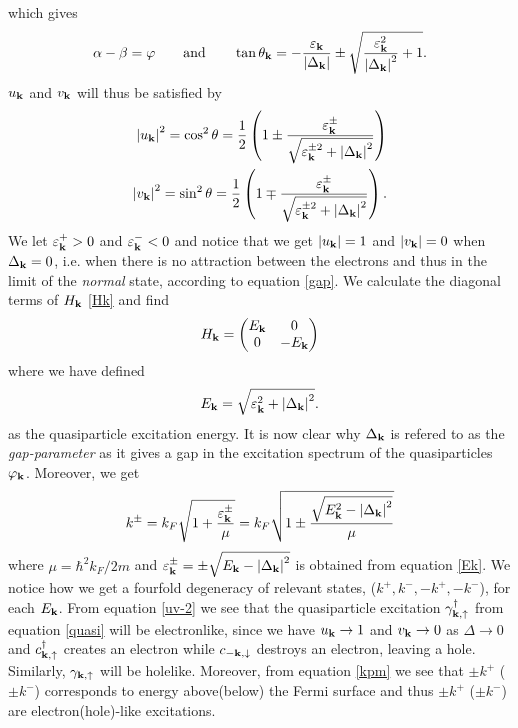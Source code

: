 which gives 
\begin{equation}
\alpha - \beta = \varphi
\qquad \mathrm{and} \qquad
\tan\theta_{\mathbf{k}} = -\frac{\varepsilon_{\mathbf{k}}}{\left|\Delta_{\mathbf{k}}\right|}\pm\sqrt{\frac{\varepsilon_{\mathbf{k}}^2}{\left|\Delta_{\mathbf{k}}\right|^2}+1}.
\label{tan}
\end{equation}
$u_{\mathbf{k}}$ and $v_{\mathbf{k}}$ will thus be satisfied by
\begin{equation}
\begin{split}
    \left|u_{\mathbf{k}}\right|^2 = \cos^2\theta = \frac{1}{2}\left(1 \pm \frac{\varepsilon^{\pm}_{\mathbf{k}}}{\sqrt{\varepsilon_{\mathbf{k}}^{\pm2} + \left|\Delta_{\mathbf{k}}\right|^2}}\right)    
    \\
    \left|v_{\mathbf{k}}\right|^2 = \sin^2\theta = \frac{1}{2}\left(1 \mp \frac{\varepsilon^{\pm}_{\mathbf{k}}}{\sqrt{\varepsilon_{\mathbf{k}}^{\pm2} + \left|\Delta_{\mathbf{k}}\right|^2}}\right).
\end{split}
\label{uv-2}
\end{equation}
We let $\varepsilon^+_{\mathbf{k}}>0$ and $\varepsilon^-_{\mathbf{k}}<0$ and notice that we get $\left|u_{\mathbf{k}}\right| = 1$ and $\left|v_{\mathbf{k}}\right| = 0$ when $\Delta_{\mathbf{k}} = 0$, i.e. when there is no attraction between the electrons and thus in the limit of the \textit{normal} state, according to equation \eqref{gap}. We calculate the diagonal terms of $H_{\mathbf{k}}$ \eqref{Hk} and find
\begin{equation}
H_{\mathbf{k}} = 
\begin{pmatrix}
    E_{\mathbf{k}} & 0\\
    0 & -E_{\mathbf{k}}
\end{pmatrix}
\label{H_diag}
\end{equation}
where we have defined 
\begin{equation}
E_{\mathbf{k}} = \sqrt{\varepsilon_{\mathbf{k}}^2 + \left| \Delta_{\mathbf{k}} \right|^2}.
\label{Ek}
\end{equation}
as the quasiparticle excitation energy. It is now clear why $\Delta_{\mathbf{k}}$ is refered to as the \textit{gap-parameter} as it gives a gap in the excitation spectrum of the quasiparticles $\varphi_{\mathbf{k}}$. Moreover, we get
\begin{equation}
    k^{\pm}=k_F\sqrt{1+\frac{\varepsilon_{\mathbf{k}}^{\pm}}{\mu}} = k_F\sqrt{1\pm\frac{\sqrt{E_{\mathbf{k}}^2-\left|\Delta_{\mathbf{k}}\right|^2}}{\mu}}
\label{kpm}
\end{equation}
where $\mu=\hbar^2k_F/2m$ and $\varepsilon_{\mathbf{k}}^{\pm} = \pm \sqrt{E_{\mathbf{k}}-\left|\Delta_{\mathbf{k}}\right|^2}$ is obtained from equation \eqref{Ek}. We notice how we get a fourfold degeneracy of relevant states, ($k^+,k^-,-k^+,-k^-$), for each $E_{\mathbf{k}}$. From equation \eqref{uv-2} we see that the quasiparticle excitation $\gamma_{\bf{k},\uparrow}^{\dagger}$ from equation \eqref{quasi} will be electronlike, since we have $u_{\mathbf{k}} \rightarrow 1$ and $v_{\mathbf{k}} \rightarrow 0$ as $\Delta \rightarrow 0$ and $c_{\bf{k},\uparrow}^{\dagger}$ creates an electron while $c_{-\bf{k},\downarrow}$ destroys an electron, leaving a hole. Similarly, $\gamma_{\bf{k},\uparrow}$ will be holelike. Moreover, from equation \eqref{kpm} we see that $\pm k^+$ ($\pm k^-$) corresponds to energy above(below) the Fermi surface and thus $\pm k^+$ ($\pm k^-$) are electron(hole)-like excitations. 
